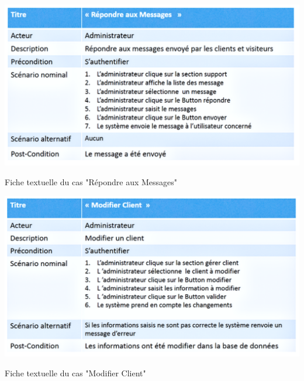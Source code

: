 \documentclass[a4paper, 12pt]{report}
\begin{document}
\begin{table}[H]
	\centering
	\includegraphics{img/fiche/24}
	\caption{Fiche textuelle du cas "Répondre aux Messages"}
	\label{Tux}
\end{table}
\begin{table}[H]
	\centering
	\includegraphics{img/fiche/25}
	\caption{Fiche textuelle du cas "Modifier Client"}
	\label{Tux}
\end{table}
\end{document}

